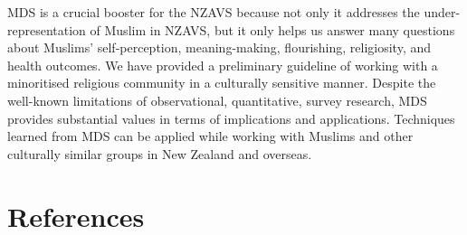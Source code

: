 \documentclass[
]{interact}
\begin{document}
MDS is a crucial booster for the NZAVS because not only it addresses the
under-representation of Muslim in NZAVS, but it only helps us answer
many questions about Muslims' self-perception, meaning-making,
flourishing, religiosity, and health outcomes. We have provided a
preliminary guideline of working with a minoritised religious community
in a culturally sensitive manner. Despite the well-known limitations of
observational, quantitative, survey research, MDS provides substantial
values in terms of implications and applications. Techniques learned
from MDS can be applied while working with Muslims and other culturally
similar groups in New Zealand and overseas.

\newpage{}

\section*{References}\label{references}
\end{document}

